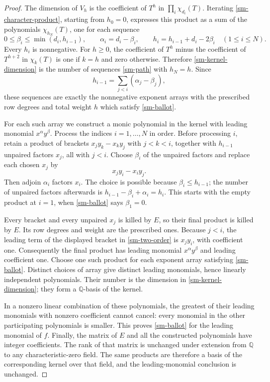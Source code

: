 \begin{proof}
The dimension of $V_h$ is the coefficient of $T^h$ in
$\prod_i\chi_{d_i}(T)$. Iterating \eqref{sm-character-product},
starting from $h_0=0$, expresses this product as a sum of the
polynomials $\chi_{h_N}(T)$, one for each sequence
\begin{equation}\label{sm-path}
 0\le\beta_i\le\min(d_i,h_{i-1}),\qquad
 \alpha_i=d_i-\beta_i,\qquad
 h_i=h_{i-1}+d_i-2\beta_i
 \quad(1\le i\le N).
\end{equation}
Every $h_i$ is nonnegative. For $h\ge0$, the coefficient of $T^h$
minus the coefficient of $T^{h+2}$ in $\chi_k(T)$ is one if $k=h$
and zero otherwise. Therefore \eqref{sm-kernel-dimension} is the
number of sequences \eqref{sm-path} with $h_N=h$.
Since
\[
                    h_{i-1}=
                         \sum_{j<i}(\alpha_j-\beta_j),
\]
these sequences are exactly the nonnegative exponent arrays with the
prescribed row degrees and total weight $h$ which satisfy
\eqref{sm-ballot}.

For each such array we construct a monic polynomial in the kernel
with leading monomial $x^\alpha y^\beta$. Process the indices
$i=1,\ldots,N$ in order. Before processing $i$, retain a product of
brackets $x_jy_k-x_ky_j$ with $j<k<i$, together with
$h_{i-1}$ unpaired factors $x_j$, all with $j<i$.
Choose $\beta_i$ of the unpaired factors and replace each chosen
$x_j$ by
\[
                            x_jy_i-x_iy_j.
\]
Then adjoin $\alpha_i$ factors $x_i$. The choice is possible because
$\beta_i\le h_{i-1}$; the number of unpaired factors afterwards is
$h_{i-1}-\beta_i+\alpha_i=h_i$. This starts with the empty product
at $i=1$, when \eqref{sm-ballot} says $\beta_1=0$.

Every bracket and every unpaired $x_j$ is killed by $E$, so their
final product is killed by $E$. Its row degrees and weight are the
prescribed ones. Because $j<i$, the leading term of the displayed
bracket in \eqref{sm-two-order} is $x_jy_i$, with coefficient one.
Consequently the final product has leading monomial
$x^\alpha y^\beta$ and leading coefficient one.
Choose one such product for each exponent array satisfying
\eqref{sm-ballot}. Distinct choices of array give distinct leading
monomials, hence linearly independent polynomials. Their number is
the dimension in \eqref{sm-kernel-dimension}; they form a
$\mathbb Q$-basis of the kernel.

In a nonzero linear combination of these polynomials, the greatest
of their leading monomials with nonzero coefficient cannot cancel:
every monomial in the other participating polynomials is smaller.
This proves \eqref{sm-ballot} for the leading monomial of $f$.
Finally, the matrix of $E$ and all the constructed polynomials have
integer coefficients. The rank of that matrix is unchanged under
extension from $\mathbb Q$ to any characteristic-zero field.
The same products are therefore a basis of the corresponding kernel
over that field, and the leading-monomial conclusion is unchanged.
\end{proof}

